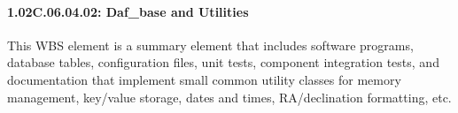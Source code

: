 \paragraph*{1.02C.06.04.02: Daf\_base and Utilities}

This WBS element is a summary element that includes software programs, database tables, configuration files, unit tests, component integration tests, and documentation that implement small common utility classes for memory management, key/value storage, dates and times, RA/declination formatting, etc.
